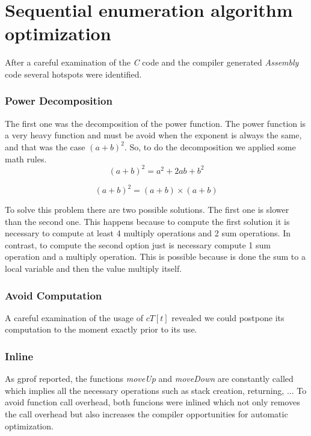 \documentclass[conference]{IEEEtran}
\begin{document}
\section{Sequential enumeration algorithm optimization}
After a careful examination of the \emph{C} code and the compiler generated \emph{Assembly} code several hotspots were identified. 

\subsubsection{Power Decomposition}
The first one was the decomposition of the power function. The power function is a very heavy function and must be avoid when the exponent is always the same, and that was the case $(a + b)^2$. So, to do the decomposition we applied some math rules.
\begin{equation}
(a + b)^2 = a^2 + 2ab + b^2
\end{equation}

\begin{equation}
(a + b)^2 = (a + b) \times (a + b)
\end{equation}

To solve this problem there are two possible solutions. The first one is slower than the second one. This happens because to compute the first solution it is necessary to compute at least 4 multiply operations and 2 sum operations. In contrast, to compute the second option just is necessary compute 1 sum operation and a multiply operation. This is possible because is done the sum to a local variable and then the value multiply itself. 

\subsubsection{Avoid Computation}
A careful examination of the usage of $cT[t]$ revealed we could postpone its computation to the moment exactly prior to its use. 

\subsubsection{Inline}
As gprof reported, the functions \emph{moveUp} and \emph{moveDown} are constantly called which implies all the necessary operations such as stack creation, returning, ... To avoid function call overhead, both funcions were inlined which not only removes the call overhead but also increases the compiler opportunities for automatic optimization.
\end{document}
